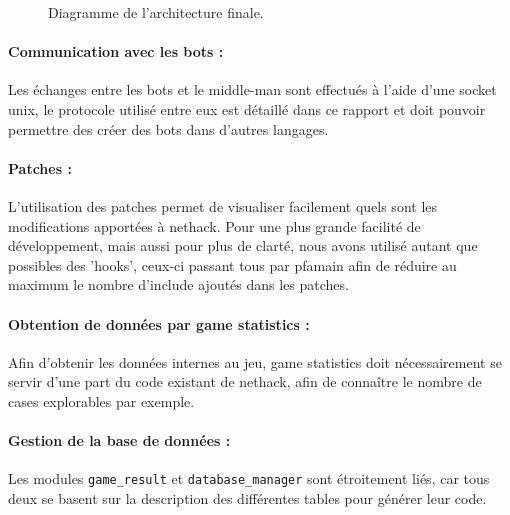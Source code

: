 \documentclass[a4paper,12pt]{article}
\begin{document}
\begin{figure}[H]
	\caption{\label{fig:architecture} Diagramme de l'architecture finale.}
\end{figure}

\paragraph{Communication avec les bots :}
Les échanges entre les bots et le middle-man sont effectués à l'aide d'une
socket unix, le protocole utilisé entre eux est détaillé dans ce rapport et doit
pouvoir permettre des créer des bots dans d'autres langages.


\paragraph{Patches :}
L'utilisation des patches permet de visualiser facilement quels sont les
modifications apportées à nethack. Pour une plus grande facilité de
développement, mais aussi pour plus de clarté, nous avons utilisé autant que
possibles des 'hooks', ceux-ci passant tous par pfamain afin de réduire au
maximum le nombre d'include ajoutés dans les patches.

\paragraph{Obtention de données par game statistics :}
Afin d'obtenir les données internes au jeu, game statistics doit nécessairement
se servir d'une part du code existant de nethack, afin de connaître le nombre de
cases explorables par exemple.

\paragraph{Gestion de la base de données :}
Les modules {\verb|game_result|} et {\verb|database_manager|} sont étroitement
liés, car tous deux se basent sur la description des différentes tables pour
générer leur code.
\end{document}
